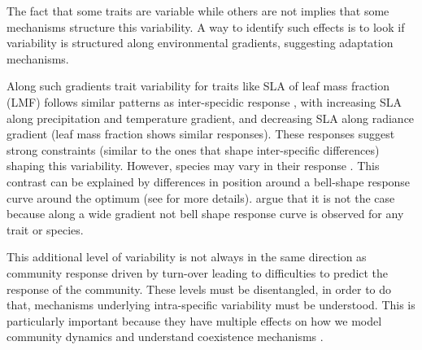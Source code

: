 



The fact that some traits are variable while others are not implies that some mechanisms structure this variability.
A way to identify such effects is to look if variability is structured along environmental gradients, suggesting adaptation mechanisms.

Along such gradients trait variability for traits like SLA \parencite{poorter_causes_2009} of leaf mass fraction (LMF) \parencite{poorter_biomass_2012} follows similar patterns as inter-specidic response \parencite{niinemets_global-scale_2001}, with increasing SLA along precipitation and temperature gradient, and decreasing SLA along radiance gradient (leaf mass fraction shows similar responses). These responses suggest strong constraints (similar to the ones that shape inter-specific differences) shaping this variability. However, species may vary in their response \parencite{kichenin_contrasting_2013}. This contrast can be explained by differences in position around a bell-shape response curve around the optimum (see \cite{albert_intraspecific_2010} for more details). \cite{kichenin_contrasting_2013} argue that it is not the case because along a wide gradient not bell shape response curve is observed for any trait or species.

This additional level of variability is not always in the same direction as community response driven by turn-over \parencite{albert_intraspecific_2010, kichenin_contrasting_2013, jung_intraspecific_2014} leading to difficulties to predict the response of the community. These levels must be disentangled, in order to do that, mechanisms underlying intra-specific variability must be understood. This is particularly important because they have multiple effects on how we model community dynamics and understand coexistence mechanisms \cite{bolnick_why_2011, violle_return_2012}.
%
%
%
%

